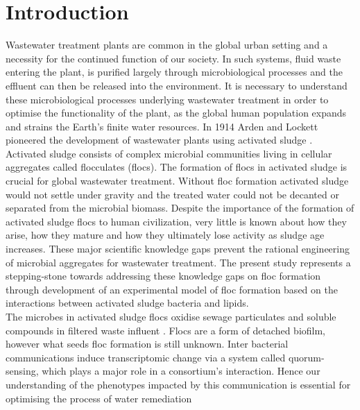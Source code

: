 \documentclass[11pt]{article}
\begin{document}
\section{Introduction}
Wastewater treatment plants are common in the global urban setting and a necessity for the continued function of our society. In such systems, fluid waste entering the plant, is purified largely through microbiological processes and the effluent can then be released into the environment. It is necessary to understand these microbiological processes underlying wastewater treatment in order to optimise the functionality of the plant, as the global human population expands and strains the Earth's finite water resources. In 1914 Arden and Lockett pioneered the development of wastewater plants using activated sludge \cite{ardern1914experiments}.\\

Activated sludge consists of complex microbial communities living in cellular aggregates called flocculates (flocs). The formation of flocs in activated sludge is crucial for global wastewater treatment. Without floc formation activated sludge would not settle under gravity and the treated water could not be decanted or separated from the microbial biomass. Despite the importance of the formation of activated sludge flocs to human civilization, very little is known about how they arise, how they mature and how they ultimately lose activity as sludge age increases. These major scientific knowledge gaps prevent the rational engineering of microbial aggregates for wastewater treatment. The present study represents a stepping-stone towards addressing these knowledge gaps on floc formation through development of an experimental model of floc formation based on the interactions between activated sludge bacteria and lipids. \\

The microbes in activated sludge flocs oxidise sewage particulates and soluble compounds in filtered waste influent \cite{Price_95}. Flocs are a form of detached biofilm, however what seeds floc formation is still unknown. Inter bacterial communications induce transcriptomic change via a system called quorum-sensing, which plays a major role in a consortium's interaction\cite{parsek2005sociomicrobiology}. Hence our understanding of the phenotypes impacted by this communication is essential for optimising the process of water remediation \cite{singh2006biofilms}\\
\end{document}
